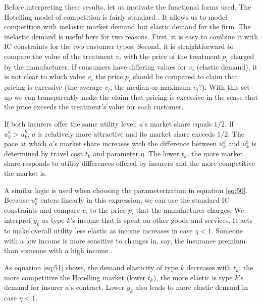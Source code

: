 \documentclass[a4paper,12pt]{article}
\begin{document}
Before interpreting these results, let us motivate the functional forms used. The Hotelling model of competition is fairly standard \citep{Tirole}. It allows us to model competition with inelastic market demand but elastic demand for the firm. The inelastic demand is useful here for two reasons. First, it is easy to combine it with IC constraints for the two customer types. Second, it is straightforward to compare the value of the treatment \(v_i\) with the price of the treatment \(p_i\) charged by the manufacturer. If consumers have differing values for \(v_i\) (elastic demand), it is not clear to which value \(v_i\) the price \(p_i\) should be compared to claim that pricing is excessive (the average \(v_{i}\), the median or maximum \(v_i\)?). With this set-up we can transparently make the claim that pricing is excessive in the sense that the price exceeds the treatment's value for each customer.

If both insurers offer the same utility level, \(a\)'s market share equals \(1/2\). If \(u^a_k > u^b_k\), \(a\) is relatively more attractive and its market share exceeds \(1/2\). The pace at which \(a\)'s market share increases with the difference between \(u_k^a\) and \(u_k^b\) is determined by travel cost \(t_k\) and parameter \(\eta\). The lower \(t_k\), the more market share responds to utility differences offered by insurers and the more competitive the market is.

A similar logic is used when choosing the parameterization in equation \eqref{eq:50}. Because \(u_k^a\) enters linearly in this expression, we can use the standard IC constraints and compare \(v_i\) to the price \(p_i\) that the manufacturer charges. We interpret \(y_k\) as type \(k\)'s income that is spent on other goods and services. It acts to make overall utility less elastic as income increases in case \(\eta<1\). Someone with a low income is more sensitive to changes in, say, the insurance premium than someone with a high income \citep{hogan2017}.

As equation \eqref{eq:51} shows, the demand elasticity of type \(k\) decreases with \(t_k\): the more competitive the Hotelling market (lower \(t_k\)), the more elastic is type \(k\)'s demand for insurer \(a\)'s contract. Lower \(y_k\) also leads to more elastic demand in case \(\eta<1\).
\end{document}
